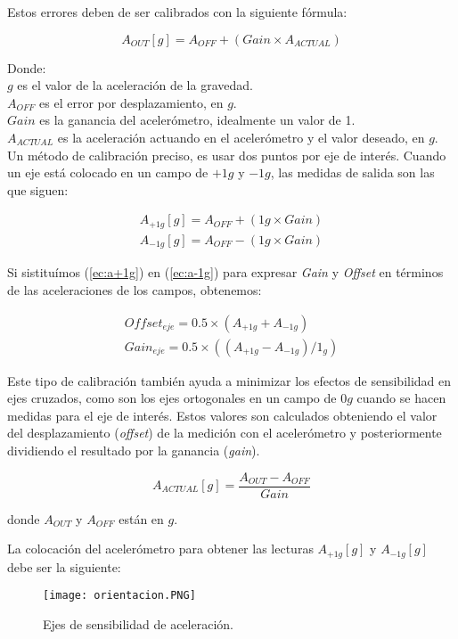 \documentclass[10pt, a4paper, twocolumn]{article} %
\begin{document}
Estos errores deben de ser calibrados con la siguiente fórmula:

$$ A_{OUT} [g] = A_{OFF} +  ( Gain \times A_{ACTUAL} )  $$

Donde:\\
$g$ es el valor de la aceleración de la gravedad.\\
$A_{OFF}$ es el error por desplazamiento, en $g$.\\
$Gain$ es la ganancia del acelerómetro, idealmente un valor de 1.\\
$A_{ACTUAL}$ es la aceleración actuando en el acelerómetro y el valor deseado, en $g$.\\

Un método de calibración preciso, es usar dos puntos por eje de interés. Cuando un eje está colocado en un campo de $+1g$ y $-1g$, las medidas de salida son las que siguen:

\begin{eqnarray}
A_{+1g} [g] = A_{OFF} + (1g \times Gain) \label{ec:a+1g} \\
A_{-1g} [g] = A_{OFF} - (1g \times Gain) \label{ec:a-1g}
\end{eqnarray}

Si sistituímos (\ref{ec:a+1g}) en (\ref{ec:a-1g}) para expresar \textit{Gain} y \textit{Offset} en términos de las aceleraciones de los campos, obtenemos:

\begin{eqnarray}
Offset_{eje} = 0.5 \times (A_{+1g} + A_{-1g}) \label{ec:offsetEje}\\
Gain_{eje} = 0.5 \times ((A_{+1g} - A_{-1g})/1_{g}) \label{ec:gainEje}
\end{eqnarray}

Este tipo de calibración también ayuda a minimizar los efectos de sensibilidad en ejes cruzados, como son los ejes ortogonales en un campo de $0g$ cuando se hacen medidas para el eje de interés. Estos valores son calculados obteniendo el valor del desplazamiento (\textit{offset}) de la medición con el acelerómetro y posteriormente dividiendo el resultado por la ganancia (\textit{gain}).

$$ A_{ACTUAL} [g] = \frac{A_{OUT}-A_{OFF}}{Gain} $$

donde $A_{OUT}$ y $A_{OFF}$ están en $g$.

La colocación del acelerómetro para obtener las lecturas $A_{+1g} [g]$ y $A_{-1g} [g]$ debe ser la siguiente:


\begin{figure}[htbp]
	\begin{center}
		\texttt{[image: orientacion.PNG]} %
		\caption{Ejes de sensibilidad de aceleración.} %
		\label{fig:orient}
	\end{center}
\end{figure}
\end{document}
